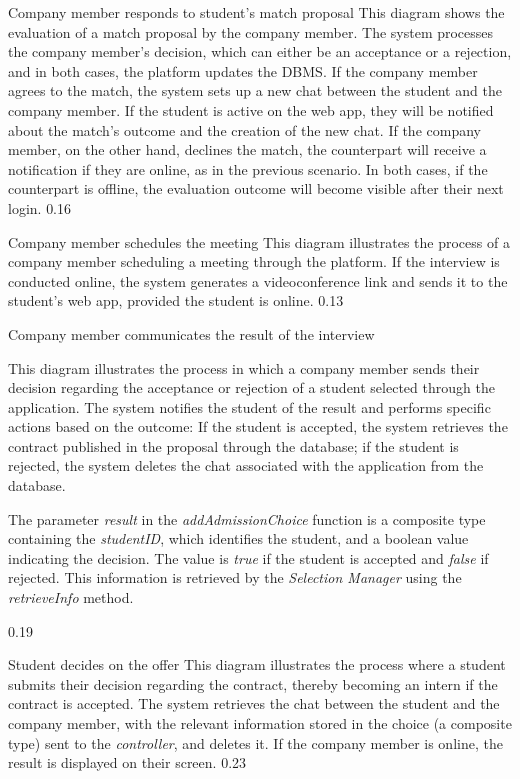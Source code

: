 \runtimeview
{Company member responds to student's match proposal}
{
    This diagram shows the evaluation of a match proposal by the company member. The system 
    processes the company member's decision, which can either be an acceptance or a rejection, 
    and in both cases, the platform updates the DBMS. If the company member agrees to the match, 
    the system sets up a new chat between the student and the company member. If the student is 
    active on the web app, they will be notified about the match's outcome and the creation of 
    the new chat. If the company member, on the other hand, declines the match, the counterpart 
    will receive a notification if they are online, as in the previous scenario. In both cases, 
    if the counterpart is offline, the evaluation outcome will become visible after their next 
    login.
}
{0.16}

\runtimeview
{Company member schedules the meeting}
{This diagram illustrates the process of a company member scheduling a meeting through the platform. If the interview is conducted online, the system generates a videoconference link and sends it to the student's web app, provided the student is online.}
{0.13}

\runtimeview
{Company member communicates the result of the interview}
{
This diagram illustrates the process in which a company member sends their decision regarding the acceptance or rejection of a student selected through the application. The system notifies the student of the result and performs specific actions based on the outcome: If the student is accepted, the system retrieves the contract published in the proposal through the database; if the student is rejected, the system deletes the chat associated with the application from the database.

The parameter \textit{result} in the \textit{addAdmissionChoice} function is a composite type containing the \textit{studentID}, which identifies the student, and a boolean value indicating the decision. The value is \textit{true} if the student is accepted and \textit{false} if rejected. This information is retrieved by the \textit{Selection Manager} using the \textit{retrieveInfo} method.
}
{0.19}

\runtimeview
{Student decides on the offer}
{This diagram illustrates the process where a student submits their decision regarding the contract, thereby becoming an intern if the contract is accepted. The system retrieves the chat between the student and the company member, with the relevant information stored in the choice (a composite type) sent to the \textit{controller}, and deletes it. If the company member is online, the result is displayed on their screen.}
{0.23}

